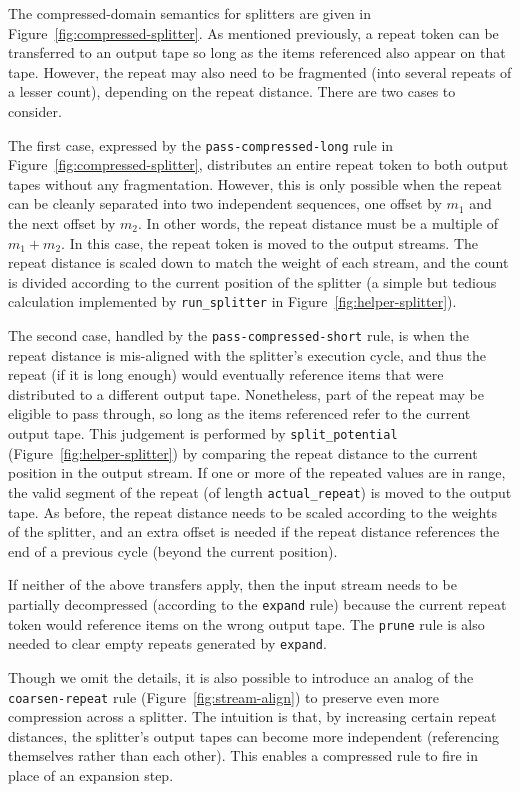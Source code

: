 The compressed-domain semantics for splitters are given in
Figure~\ref{fig:compressed-splitter}.  As mentioned previously, a
repeat token can be transferred to an output tape so long as the items
referenced also appear on that tape.  However, the repeat may also
need to be fragmented (into several repeats of a lesser count),
depending on the repeat distance.  There are two cases to consider.

The first case, expressed by the {\tt pass-compressed-long} rule in
Figure~\ref{fig:compressed-splitter}, distributes an entire repeat
token to both output tapes without any fragmentation.  However, this
is only possible when the repeat can be cleanly separated into two
independent sequences, one offset by $m_1$ and the next offset by
$m_2$.  In other words, the repeat distance must be a multiple of
$m_1+m_2$.  In this case, the repeat token is moved to the output
streams.  The repeat distance is scaled down to match the weight of
each stream, and the count is divided according to the current
position of the splitter (a simple but tedious calculation implemented
by {\tt run\_splitter} in Figure~\ref{fig:helper-splitter}).

The second case, handled by the {\tt pass-compressed-short} rule, is
when the repeat distance is mis-aligned with the splitter's execution
cycle, and thus the repeat (if it is long enough) would eventually
reference items that were distributed to a different output tape.
Nonetheless, part of the repeat may be eligible to pass through, so
long as the items referenced refer to the current output tape.  This
judgement is performed by {\tt split\_potential}
(Figure~\ref{fig:helper-splitter}) by comparing the repeat distance to
the current position in the output stream.  If one or more of the
repeated values are in range, the valid segment of the repeat (of
length {\tt actual\_repeat}) is moved to the output tape.  As before,
the repeat distance needs to be scaled according to the weights of the
splitter, and an extra offset is needed if the repeat distance
references the end of a previous cycle (beyond the current position).

If neither of the above transfers apply, then the input stream needs
to be partially decompressed (according to the {\tt expand} rule)
because the current repeat token would reference items on the wrong
output tape.  The {\tt prune} rule is also needed to clear empty
repeats generated by {\tt expand}.

Though we omit the details, it is also possible to introduce an analog
of the {\tt coarsen-repeat} rule (Figure~\ref{fig:stream-align}) to
preserve even more compression across a splitter.  The intuition is
that, by increasing certain repeat distances, the splitter's output
tapes can become more independent (referencing themselves rather than
each other).  This enables a compressed rule to fire in place of an
expansion step.

